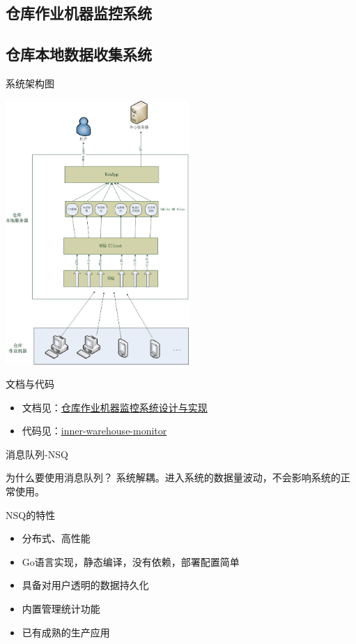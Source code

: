 \documentclass[CJK]{beamer}
\begin{document}
\begin{CJK*}{UTF8}{gbsn}
\section{仓库作业机器监控系统}

\subsection{仓库本地数据收集系统}

\begin{frame}{系统架构图}
\begin{center}
\includegraphics[height=10cm, angle=90]{inner_warehouse_monitor-arch.png}
\end{center}
\end{frame}

\begin{frame}{文档与代码}
\begin{itemize}
\item 文档见：\href{http://youngsterxyf.github.io/2013/11/29/inner_warehouse_monitor_system/}{仓库作业机器监控系统设计与实现}
\item 代码见：\href{http://10.24.178.60:8000/inner-warehouse-monitor}{inner-warehouse-monitor}
\end{itemize}
\end{frame}

\begin{frame}{消息队列-NSQ}
\begin{block}{为什么要使用消息队列？}
系统解耦。进入系统的数据量波动，不会影响系统的正常使用。
\end{block}
\begin{block}{NSQ的特性}
\begin{itemize}
\item 分布式、高性能
\item Go语言实现，静态编译，没有依赖，部署配置简单
\item 具备对用户透明的数据持久化
\item 内置管理统计功能
\item 已有成熟的生产应用
\end{itemize}
\end{block}
\end{frame}


\end{CJK*}
\end{document}
